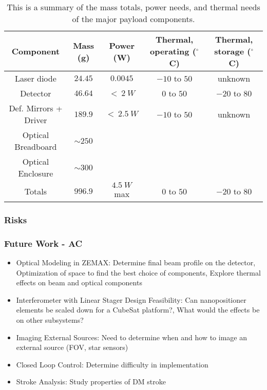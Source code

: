 \documentclass[12pt]{article}
\begin{document}
\begin{table}\label{fig:payload_summary_table}
\caption{This is a summary of the mass totals, power needs, and thermal needs of the major payload components.}
\begin{tabular}{|c||c|c|c|c|} \hline
	Component & Mass (g) & Power (W) & Thermal, operating ($^\circ$C) & Thermal, storage ($^\circ$C) \\ \hline \hline
Laser diode & $24.45$ & $0.0045$ & $-10$ to $50$ & unknown \\
Detector & $46.64$ & $<\ 2\ W$ & $0$ to $50$ & $-20$ to $80$ \\
Def. Mirrors + Driver & $189.9$ & $<\ 2.5\ W$ & $-10$ to $50$ & unknown \\
Optical Breadboard & $\sim 250$ & ~ & ~ & \\
Optical Enclosure & $\sim 300$ & ~ & ~ & \\ \hline \hline
Totals & $996.9$ & $4.5\ W$ max & $0$ to $50$ & $-20$ to $80$ \\ \hline
\end{tabular}
\end{table}

			\subsubsection{Risks}

			\subsubsection{Future Work - AC}

\begin{itemize}
\item{Optical Modeling in ZEMAX}: Determine final beam profile on the detector, Optimization of 
space to find the best choice of components, Explore thermal effects on beam and optical components

\item{Interferometer with Linear Stager Design Feasibility}: Can nanopositioner elements be scaled down for a CubeSat platform?, What would the effects be on other subsystems?

\item{Imaging External Sources}: Need to determine when and how to image an external source (FOV, star sensors)

\item{Closed Loop Control}: Determine difficulty in implementation

\item{Stroke Analysis}: Study properties of DM stroke

\end{itemize}
\end{document}
